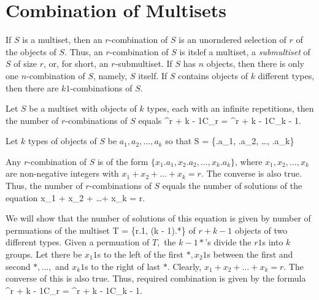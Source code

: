 \section{Combination of Multisets}
If $S$ is a multiset, then an $r$-combination of $S$ is an unorndered selection of $r$ of the objects of $S$. Thus, an
$r$-combination of $S$ is itslef a multiset, a {\it submultiset} of $S$ of size $r$, or, for short, an $r$-submultiset. If $S$
has $n$ objects, then there is only one $n$-combination of $S$, namely, $S$ itself. If $S$ contains objects of $k$ different types,
then there are $k 1$-combinations of $S$.

Let $S$ be a multiset with objects of $k$ types, each with an infinite repetitions, then the number of $r$-combinations of $S$
equals
\startformula {}^{r + k - 1}C_r = {}^{r + k - 1}C_{k - 1}.\stopformula

Let $k$ types of objects of $S$ be $a_1, a_2, \ldots, a_k$ so that
\startformula S = \{\infty.a_1, \infty.a_2, \ldots, \infty.a_k\}\stopformula

Any $r$-combination of $S$ is of the form $\{x_1.a_1, x_2.a_2, \ldots, x_k.a_k\}$, where $x_1, x_2, \ldots, x_k$ are non-negative
integers with $x_1 + x_2 + \ldots + x_k = r$. The converse is also true. Thus, the number of $r$-combinations of $S$ equals the
number of solutions of the equation \startformula x_1 + x_2 + \ldots + x_k = r.\stopformula

We will show that the number of solutions of this equation is given by number of permuations of the multiset
\startformula T = \{r.1, (k - 1).*\}\stopformula
of $r + k - 1$ objects of two different types. Given a permuation of $T,$ the $k - 1 *$'s divide the $r 1$s into $k$ groups. Let
there be $x_1 1$s to the left of the first $*, x_2 1$s between the first and second $*,\ldots,$ and $x_k 1$s to the right of last
$*$. Clearly, $x_1 + x_2 + \ldots + x_k = r$. The converse of this is also true. Thus, required combination is given by the
formula \startformula {}^{r + k - 1}C_r = {}^{r + k - 1}C_{k - 1}.\stopformula

